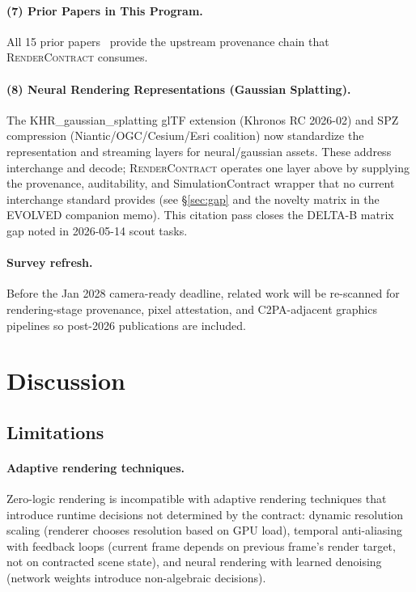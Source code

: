 \documentclass[sigconf,nonacm]{acmart}
\newcommand{\rendercontract}{\textsc{RenderContract}}
\begin{document}
\paragraph{(7) Prior Papers in This Program.}
All 15 prior papers~\cite{trustbyconstruction2026,%
capstone-uist2027,paper-0c-cael-aamas2027,%
paper-1-mcp-usenix2027,paper-2-snn-neurips2026,%
paper-3-crdt-ecoop2027,paper-4-sandbox-usenix,%
paper-5-graphrag-icse,paper-6-anim-sca2027,%
paper-7-ik-siggraph2027,paper-8-unified-siggraph2027,%
paper-9-motion-asia2027,paper-10-hs-core-pldi2027,%
paper-11-hsplus-ecoop2027,paper-12-holo-i3d2027}
provide the upstream provenance chain that
\rendercontract{} consumes.

\paragraph{(8) Neural Rendering Representations (Gaussian Splatting).}
The KHR\_gaussian\_splatting glTF extension (Khronos RC 2026-02) and
SPZ compression (Niantic/OGC/Cesium/Esri coalition) now standardize
the representation and streaming layers for neural/gaussian assets.
These address interchange and decode; \rendercontract{} operates one
layer above by supplying the provenance, auditability, and
SimulationContract wrapper that no current interchange standard
provides (see \S\ref{sec:gap} and the novelty matrix in the
EVOLVED companion memo). This citation pass closes the DELTA-B
matrix gap noted in 2026-05-14 scout tasks.

\paragraph{Survey refresh.}
Before the Jan 2028 camera-ready deadline, related work will be
re-scanned for rendering-stage provenance, pixel attestation, and
C2PA-adjacent graphics pipelines so post-2026 publications are
included.

\section{Discussion}
\label{sec:discussion}

\subsection{Limitations}

\paragraph{Adaptive rendering techniques.}
Zero-logic rendering is incompatible with adaptive rendering
techniques that introduce runtime decisions not determined by
the contract: dynamic resolution scaling (renderer chooses
resolution based on GPU load), temporal anti-aliasing with
feedback loops (current frame depends on previous frame's
render target, not on contracted scene state), and neural
rendering with learned denoising (network weights introduce
non-algebraic decisions).
\end{document}
